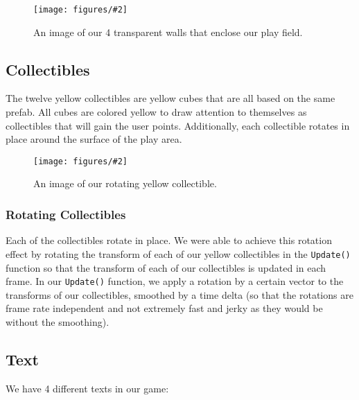 \documentclass[12pt]{article}
\newcommand{\sfig}[3]{\begin{figure}[!ht]
\begin{center}
\texttt{[image: figures/\#2]}
\caption{#3}
\label{#2}
\end{center}
\end{figure}}
\begin{document}
  \sfig{5in}{walls}{An image of our 4 transparent walls that enclose our play field.}

\subsection{Collectibles}
  The twelve yellow collectibles are yellow cubes that are all based on the same prefab. All cubes are colored yellow to draw attention to themselves as collectibles that will gain the user points. Additionally, each collectible rotates in place around the surface of the play area.

  \sfig{2in}{collectible}{An image of our rotating yellow collectible.}

\subsubsection{Rotating Collectibles}
  Each of the collectibles rotate in place. We were able to achieve this rotation effect by rotating the transform of each of our yellow collectibles in the \verb+Update()+ function so that the transform of each of our collectibles is updated in each frame. In our \verb+Update()+ function, we apply a rotation by a certain vector to the transforms of our collectibles, smoothed by a time delta (so that the rotations are frame rate independent and not extremely fast and jerky as they would be without the smoothing).

\subsection{Text}

We have 4 different texts in our game:
\end{document}
